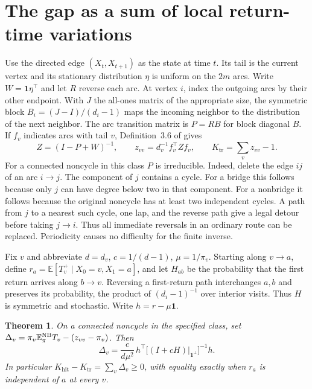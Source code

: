 \documentclass[11pt]{article}
\newtheorem{theorem}{Theorem}
\newcommand{\one}{\mathbf 1}
\newcommand{\E}{\mathbb E}
\newcommand{\Kh}{K_{\mathrm{hit}}}
\newcommand{\Kt}{K_{\mathrm{tr}}}
\begin{document}
\section{The gap as a sum of local return-time variations}
Use the directed edge $(X_t,X_{t+1})$ as the state at time $t$. Its tail is the current vertex and its stationary distribution $\eta$ is uniform on the $2m$ arcs. Write $W=\one\eta^\top$ and let $R$ reverse each arc. At vertex $i$, index the outgoing arcs by their other endpoint. With $J$ the all-ones matrix of the appropriate size, the symmetric block $B_i=(J-I)/(d_i-1)$ maps the incoming neighbor to the distribution of the next neighbor. The arc transition matrix is $P=RB$ for block diagonal $B$. If $f_v$ indicates arcs with tail $v$, Definition~3.6 of \cite{breen} gives
\[
 Z=(I-P+W)^{-1},\qquad z_{vv}=d_v^{-1} f_v^\top Z f_v,\qquad
 \Kt=\sum_v z_{vv}-1.
\]
For a connected noncycle in this class $P$ is irreducible. Indeed, delete the edge $ij$ of an arc $i\to j$. The component of $j$ contains a cycle. For a bridge this follows because only $j$ can have degree below two in that component. For a nonbridge it follows because the original noncycle has at least two independent cycles. A path from $j$ to a nearest such cycle, one lap, and the reverse path give a legal detour before taking $j\to i$. Thus all immediate reversals in an ordinary route can be replaced. Periodicity causes no difficulty for the finite inverse.

Fix $v$ and abbreviate $d=d_v$, $c=1/(d-1)$, $\mu=1/\pi_v$.
Starting along $v\to a$, define $r_a=\E[T_v^+\mid X_0=v,X_1=a]$, and let $H_{ab}$ be the probability that the first return arrives along $b\to v$. Reversing a first-return path interchanges $a,b$ and preserves its probability, the product of $(d_i-1)^{-1}$ over interior visits. Thus $H$ is symmetric and stochastic. Write $h=r-\mu\one$.

\begin{theorem}\label{th:local}
On a connected noncycle in the specified class, set $\Delta_v=\pi_v\E_\pi^{\rm NB}T_v-(z_{vv}-\pi_v)$. Then
\[
 \Delta_v=\frac{c}{d\mu^2}\,h^\top\big[(I+cH)|_{\one^\perp}\big]^{-1}h .
 \tag{1}
\]
In particular $\Kh-\Kt=\sum_v\Delta_v\ge0$, with equality exactly when $r_a$ is independent of $a$ at every $v$.
\end{theorem}
\end{document}

